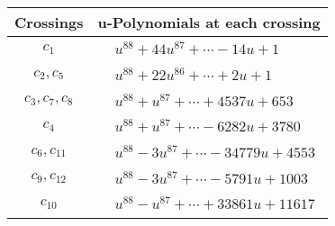 \documentclass[1p]{elsarticle_modified}
\theoremstyle{definition}
\begin{document}
\begin{tabular}{m{50pt}|m{274pt}}
Crossings & \hspace{64pt}u-Polynomials at each crossing \\
\hline $$\begin{aligned}c_{1}\end{aligned}$$&$\begin{aligned}
&u^{88}+44 u^{87}+\cdots-14 u+1
\end{aligned}$\\
\hline $$\begin{aligned}c_{2},c_{5}\end{aligned}$$&$\begin{aligned}
&u^{88}+22 u^{86}+\cdots+2 u+1
\end{aligned}$\\
\hline $$\begin{aligned}c_{3},c_{7},c_{8}\end{aligned}$$&$\begin{aligned}
&u^{88}+u^{87}+\cdots+4537 u+653
\end{aligned}$\\
\hline $$\begin{aligned}c_{4}\end{aligned}$$&$\begin{aligned}
&u^{88}+u^{87}+\cdots-6282 u+3780
\end{aligned}$\\
\hline $$\begin{aligned}c_{6},c_{11}\end{aligned}$$&$\begin{aligned}
&u^{88}-3 u^{87}+\cdots-34779 u+4553
\end{aligned}$\\
\hline $$\begin{aligned}c_{9},c_{12}\end{aligned}$$&$\begin{aligned}
&u^{88}-3 u^{87}+\cdots-5791 u+1003
\end{aligned}$\\
\hline $$\begin{aligned}c_{10}\end{aligned}$$&$\begin{aligned}
&u^{88}- u^{87}+\cdots+33861 u+11617
\end{aligned}$\\
\hline
\end{tabular}\\~\\
\newpage\renewcommand{\arraystretch}{1}
\end{document}
